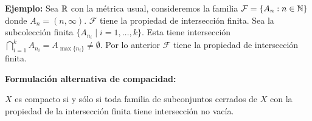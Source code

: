 \textbf{Ejemplo:} Sea $\mathbb{R}$ con la métrica usual, consideremos la familia $\mathcal{F} = \{A_n : n \in \mathbb{N}\}$ donde $A_n = (n, \infty)$. $\mathcal{F}$ tiene la propiedad de intersección finita. Sea la subcolección finita $\{A_{n_i} \mid i=1,\dots,k\}$. Esta tiene intersección $\bigcap_{i=1}^k A_{n_i} = A_{\max\{n_i\}} \ne \emptyset$. Por lo anterior $\mathcal{F}$ tiene la propiedad de intersección finita.

\vspace{0.5cm}
\noindent\textbf{Formulación alternativa de compacidad:}

\begin{teorema}
    $X$ es compacto si y sólo si toda familia de subconjuntos cerrados de $X$ con la propiedad de la intersección finita tiene intersección no vacía.
\end{teorema}

